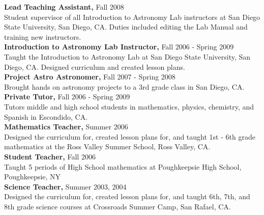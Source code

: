 \documentclass{res}
\begin{document}
\begin{resume}
        
    {\bf  Lead Teaching Assistant,} Fall 2008  \\
         Student supervisor of all Introduction to Astronomy Lab instructors at San Diego State University, 
         San Diego, CA. Duties included editing the Lab Manual and training new instructors. \\
		 
   {\bf  Introduction to Astronomy Lab Instructor,} Fall 2006 - Spring 2009  \\
         Taught the Introduction to Astronomy Lab at San Diego State University, San Diego, CA. 
         Designed curriculum and created lesson plans. \\
         
   {\bf Project Astro Astronomer, } Fall 2007 - Spring 2008 \\
   		Brought hands on astronomy projects to a 3rd grade class in San Diego, CA. \\

   {\bf Private Tutor, } Fall 2006 - Spring 2009 \\
   		Tutors middle and high school students in mathematics, physics, chemistry, and Spanish in Escondido, CA. \\
   		
   {\bf Mathematics Teacher, } Summer 2006 \\
   		Designed the curriculum for, created lesson plans for, and taught 1st - 6th grade 
   		mathematics at the Ross Valley Summer School, Ross Valley, CA. \\
   	
   {\bf Student Teacher, } Fall 2006 \\
   		Taught 5 periods of High School mathematics at Poughkeepsie High School, Poughkeepsie, NY \\
   	
   {\bf Science Teacher, } Summer 2003, 2004 \\
   		Designed the curriculum for, created lesson plans for, and taught 6th, 7th, and 8th grade 
   		science courses at Crossroads Summer Camp, San Rafael, CA.


\end{resume}
\end{document}
